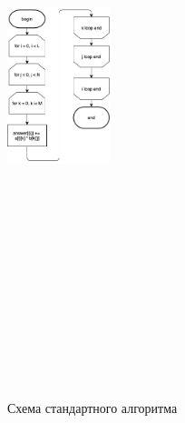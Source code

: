 \documentclass[12pt]{article}
\begin{document}
\begin{figure}[ht!]
	\centering
	\includegraphics[width=30mm, height=180mm]{multiply.png}
	\caption{Схема стандартного алгоритма\label{overflow}}
\end{figure}
\end{document}
